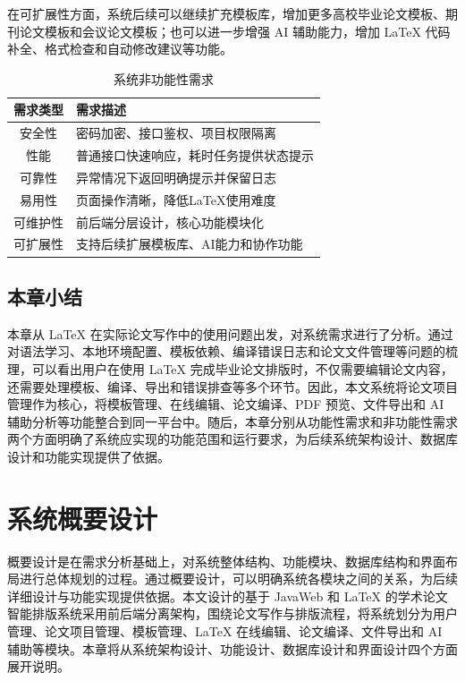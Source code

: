\documentclass{xduugthesis}
\begin{document}
在可扩展性方面，系统后续可以继续扩充模板库，增加更多高校毕业论文模板、期刊论文模板和会议论文模板；也可以进一步增强 AI 辅助能力，增加 LaTeX 代码补全、格式检查和自动修改建议等功能。

\begin{table}[!ht]
    \centering
    \caption{系统非功能性需求}
    \label{tab:non-functional-requirement}
    \begin{tabular}{|c|p{9cm}|}
        \hline
        需求类型 & 需求描述 \\
        \hline
        安全性 & 密码加密、接口鉴权、项目权限隔离 \\
        \hline
        性能 & 普通接口快速响应，耗时任务提供状态提示 \\
        \hline
        可靠性 & 异常情况下返回明确提示并保留日志 \\
        \hline
        易用性 & 页面操作清晰，降低LaTeX使用难度 \\
        \hline
        可维护性 & 前后端分层设计，核心功能模块化 \\
        \hline
        可扩展性 & 支持后续扩展模板库、AI能力和协作功能 \\
        \hline
    \end{tabular}
\end{table}

\section{本章小结}
本章从 LaTeX 在实际论文写作中的使用问题出发，对系统需求进行了分析。通过对语法学习、本地环境配置、模板依赖、编译错误日志和论文文件管理等问题的梳理，可以看出用户在使用 LaTeX 完成毕业论文排版时，不仅需要编辑论文内容，还需要处理模板、编译、导出和错误排查等多个环节。因此，本文系统将论文项目管理作为核心，将模板管理、在线编辑、论文编译、PDF 预览、文件导出和 AI 辅助分析等功能整合到同一平台中。随后，本章分别从功能性需求和非功能性需求两个方面明确了系统应实现的功能范围和运行要求，为后续系统架构设计、数据库设计和功能实现提供了依据。

\chapter{系统概要设计}
概要设计是在需求分析基础上，对系统整体结构、功能模块、数据库结构和界面布局进行总体规划的过程。通过概要设计，可以明确系统各模块之间的关系，为后续详细设计与功能实现提供依据。本文设计的基于 JavaWeb 和 LaTeX 的学术论文智能排版系统采用前后端分离架构，围绕论文写作与排版流程，将系统划分为用户管理、论文项目管理、模板管理、LaTeX 在线编辑、论文编译、文件导出和 AI 辅助等模块。本章将从系统架构设计、功能设计、数据库设计和界面设计四个方面展开说明。
\end{document}

